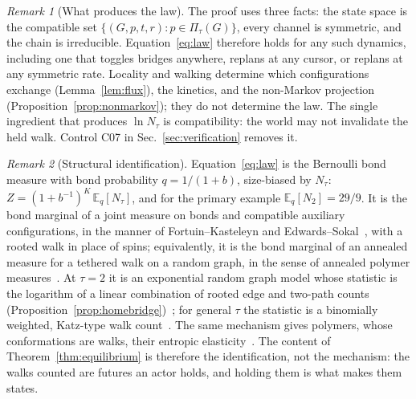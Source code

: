 \documentclass[aps,pre,preprint,superscriptaddress,nofootinbib]{revtex4-2}
\theoremstyle{definition}
\theoremstyle{remark}
\newtheorem{remark}{Remark}
\newcommand{\N}{N_\tau}
\newcommand{\Pl}{\Pi_\tau}
\begin{document}
\begin{remark}[What produces the law]
\label{rem:construction}
The proof uses three facts: the state space is the compatible set $\{(G,p,t,r):p\in\Pl(G)\}$, every channel is symmetric, and the chain is irreducible. Equation~\eqref{eq:law} therefore holds for any such dynamics, including one that toggles bridges anywhere, replans at any cursor, or replans at any symmetric rate. Locality and walking determine which configurations exchange (Lemma~\ref{lem:flux}), the kinetics, and the non-Markov projection (Proposition~\ref{prop:nonmarkov}); they do not determine the law. The single ingredient that produces $\ln\N$ is compatibility: the world may not invalidate the held walk. Control C07 in Sec.~\ref{sec:verification} removes it.
\end{remark}

\begin{remark}[Structural identification]
\label{rem:structure}
Equation~\eqref{eq:law} is the Bernoulli bond measure with bond probability $q=1/(1+b)$, size-biased by $\N$: $Z=(1+b^{-1})^K\,\mathbb E_q[\N]$, and for the primary example $\mathbb E_q[N_2]=29/9$. It is the bond marginal of a joint measure on bonds and compatible auxiliary configurations, in the manner of Fortuin--Kasteleyn and Edwards--Sokal~\cite{FortuinKasteleyn1972,EdwardsSokal1988}, with a rooted walk in place of spins; equivalently, it is the bond marginal of an annealed measure for a tethered walk on a random graph, in the sense of annealed polymer measures~\cite{Comets2017}. At $\tau=2$ it is an exponential random graph model whose statistic is the logarithm of a linear combination of rooted edge and two-path counts (Proposition~\ref{prop:homebridge})~\cite{FrankStrauss1986,ParkNewman2004}; for general $\tau$ the statistic is a binomially weighted, Katz-type walk count~\cite{Katz1953,EstradaHatano2008}. The same mechanism gives polymers, whose conformations are walks, their entropic elasticity~\cite{Flory1969}. The content of Theorem~\ref{thm:equilibrium} is therefore the identification, not the mechanism: the walks counted are futures an actor holds, and holding them is what makes them states.
\end{remark}
\end{document}
